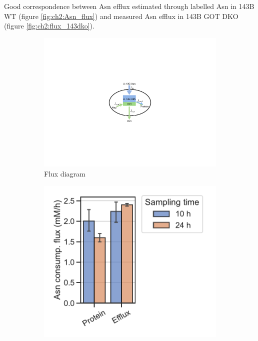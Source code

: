 Good correspondence between Asn efflux estimated through labelled Asn in 143B WT (figure \ref{fig:ch2:Asn_flux}) and measured Asn efflux in 143B GOT DKO (figure \ref{fig:ch2:flux_143dko}).
\begin{figure}
     \centering
     \hspace{0.05\textwidth}
     \begin{subfigure}[b]{0.35\textwidth}
         \centering
         \includegraphics[width=\textwidth]{figures/chap2/asn_Jprot.pdf}
         \caption{Flux diagram}
         \label{fig:ch2:asn_Jprot}
     \end{subfigure}
     \hfill
     \begin{subfigure}[b]{0.4\textwidth}
         \centering
         \includegraphics[width=\textwidth]{figures/chap2/Asn_flux.pdf}

\end{subfigure}
\end{figure}
